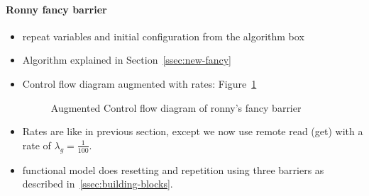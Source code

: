 \documentclass[a4paper, 10pt]{article}
\begin{document}
\paragraph{Ronny fancy barrier}
\label{ssssec:analysis-modelchecking-modelling-ronny-fancy}
\begin{itemize}
	\item repeat variables and initial configuration from the algorithm box
	\item Algorithm explained in Section~\ref{ssec:new-fancy}
	\item Control flow diagram augmented with rates: Figure~\ref{fig:model-ronny-fancy}
		\begin{figure}[htbp]
			\centering
			
			\caption{Augmented Control flow diagram of ronny's fancy barrier}
			\label{fig:model-ronny-fancy}
		\end{figure}
	\item Rates are like in previous section, except we now use remote read (get) with a rate of $\lambda_g = \frac{1}{100}$.
	\item functional model does resetting and repetition using three barriers as described in~\ref{ssec:building-blocks}.
\end{itemize}

\end{document}
